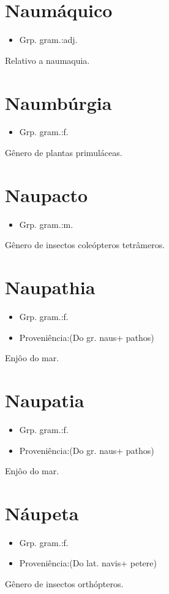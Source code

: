 \section{Naumáquico}
\begin{itemize}
\item {Grp. gram.:adj.}
\end{itemize}
Relativo a naumaquia.
\section{Naumbúrgia}
\begin{itemize}
\item {Grp. gram.:f.}
\end{itemize}
Gênero de plantas primuláceas.
\section{Naupacto}
\begin{itemize}
\item {Grp. gram.:m.}
\end{itemize}
Gênero de insectos coleópteros tetrâmeros.
\section{Naupathia}
\begin{itemize}
\item {Grp. gram.:f.}
\end{itemize}
\begin{itemize}
\item {Proveniência:(Do gr. \textunderscore naus\textunderscore  + \textunderscore pathos\textunderscore )}
\end{itemize}
Enjôo do mar.
\section{Naupatia}
\begin{itemize}
\item {Grp. gram.:f.}
\end{itemize}
\begin{itemize}
\item {Proveniência:(Do gr. \textunderscore naus\textunderscore  + \textunderscore pathos\textunderscore )}
\end{itemize}
Enjôo do mar.
\section{Náupeta}
\begin{itemize}
\item {Grp. gram.:f.}
\end{itemize}
\begin{itemize}
\item {Proveniência:(Do lat. \textunderscore navis\textunderscore  + \textunderscore petere\textunderscore )}
\end{itemize}
Gênero de insectos orthópteros.

